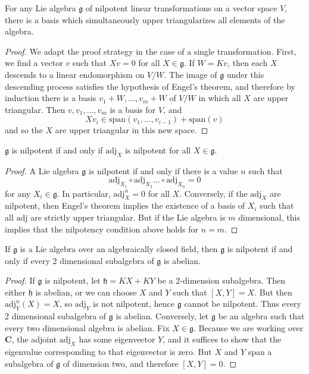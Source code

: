 \begin{theorem}[Engel]
    For any Lie algebra $\mathfrak{g}$ of nilpotent linear transformations on a vector space $V$, there is a basis which simultaneously upper triangularizes all elements of the algebra.
\end{theorem}
\begin{proof}
    We adapt the proof strategy in the case of a single transformation. First, we find a vector $v$ such that $Xv = 0$ for all $X \in \mathfrak{g}$. If $W = K v$, then each $X$ descends to a linear endomorphism on $V/W$. The image of $\mathfrak{g}$ under this descending process satisfies the hypothesis of Engel's theorem, and therefore by induction there is a basis $v_1 + W, \dots, v_m + W$ of $V/W$ in which all $X$ are upper triangular. Then $v, v_1, \dots, v_m$ is a basis for $V$, and
    \[ Xv_i \in \text{span}(v_1, \dots, v_{i-1}) + \text{span}(v) \]
    and so the $X$ are upper triangular in this new space.
\end{proof}

\begin{corollary}
    $\mathfrak{g}$ is nilpotent if and only if $\text{adj}_X$ is nilpotent for all $X \in \mathfrak{g}$.
\end{corollary}
\begin{proof}
    A Lie algebra $\mathfrak{g}$ is nilpotent if and only if there is a value $n$ such that
    \[ \text{adj}_{X_1} \circ \text{adj}_{X_2} \dots \circ \text{adj}_{X_n} = 0 \]
    for any $X_i \in \mathfrak{g}$. In particular, $\text{adj}_X^n = 0$ for all $X$. Conversely, if the $\text{adj}_X$ are nilpotent, then Engel's theorem implies the existence of a basis of $X_i$ such that all $\text{adj}$ are strictly upper triangular. But if the Lie algebra is $m$ dimensional, this implies that the nilpotency condition above holds for $n = m$.
\end{proof}

\begin{corollary}
    If $\mathfrak{g}$ is a Lie algebra over an algebraically closed field, then $\mathfrak{g}$ is nilpotent if and only if every 2 dimensional subalgebra of $\mathfrak{g}$ is abelian.
\end{corollary}
\begin{proof}
    If $\mathfrak{g}$ is nilpotent, let $\mathfrak{h} = KX + KY$ be a 2-dimension subalgebra. Then either $\mathfrak{h}$ is abelian, or we can choose $X$ and $Y$ such that $[X,Y] = X$. But then $\text{adj}^n_Y(X) = X$, so $\text{adj}_Y$ is not nilpotent, hence $\mathfrak{g}$ cannot be nilpotent. Thus every 2 dimensional subalgebra of $\mathfrak{g}$ is abelian. Conversely, let $\mathfrak{g}$ be an algebra such that every two dimensional algebra is abelian. Fix $X \in \mathfrak{g}$. Because we are working over $\mathbf{C}$, the adjoint $\text{adj}_X$ has some eigenvector $Y$, and it suffices to show that the eigenvalue corresponding to that eigenvector is zero. But $X$ and $Y$ span a subalgebra of $\mathfrak{g}$ of dimension two, and therefore $[X,Y] = 0$.
\end{proof}


